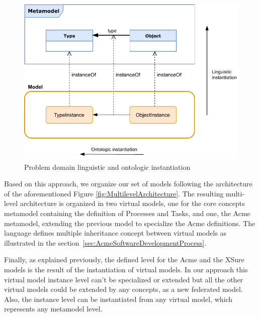 \begin{figure}
    \centering
    \includegraphics[width=1.0 \columnwidth]{Figures/Instantiation.pdf}
    \caption{Problem  domain linguistic and ontologic instantiation}
    \label{fig:LinguisticAndOntologicInstantiation}
\end{figure}

Based on this approach, we organize our set of models following the architecture of the aforementioned Figure \ref{fig:MultilevelArchitecture}. The resulting multi-level architecture is organized in two virtual models, one for the core concepts metamodel containing the definition of Processes and Tasks, and one, the Acme metamodel, extending the previous model to specialize the Acme definitions. The \FML language defines multiple inheritance concept between virtual models as illustrated in the section~\ref{sec:AcmeSoftwareDevelopmentProcess}.

Finally, as explained previously, the defined level for the Acme  and the XSure models is the result of the instantiation of virtual models. In our approach this virtual model instance level can't be specialized or extended but all the other virtual models could be extended by any concepts, as a new federated model.
Also, the instance level can be instantiated from any virtual model, which represents any metamodel level.



